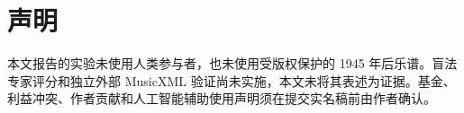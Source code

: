 \section*{声明}

本文报告的实验未使用人类参与者，也未使用受版权保护的 1945 年后乐谱。盲法专家评分和独立外部 MusicXML 验证尚未实施，本文未将其表述为证据。基金、利益冲突、作者贡献和人工智能辅助使用声明须在提交实名稿前由作者确认。
